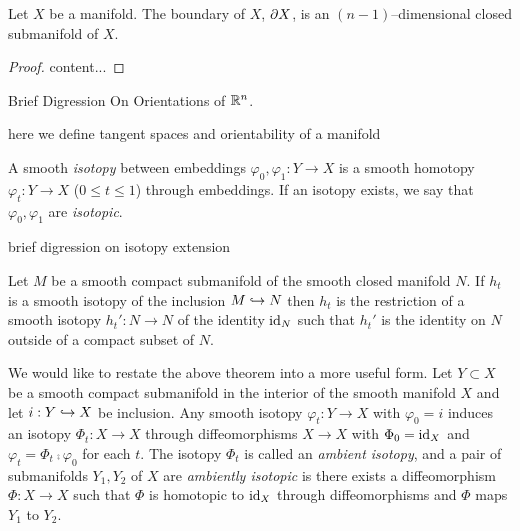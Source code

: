 \begin{prop}
	\label{prop:boundariesaremanifolds}
	Let $X$ be a manifold.
	The boundary of $X$, $\partial X$, is an $(n-1)$--dimensional closed submanifold of $X$.
\end{prop}

\begin{proof}
	content...
\end{proof}

Brief Digression On Orientations of $\mathbb{R}^n$.

\begin{defn}
	\label{def:orient}
	
	here we define tangent spaces and orientability of a manifold
	
\end{defn}

\begin{defn}
	\label{def:isotopy}
	
	A smooth \emph{isotopy} between embeddings $\varphi_0,\varphi_1:Y\to X$ is a smooth homotopy $\varphi_t: Y \to X$ ($0\leq t\leq 1$) through embeddings.
	If an isotopy exists, we say that $\varphi_0,\varphi_1$ are \emph{isotopic}.
	
\end{defn}

brief digression on isotopy extension

\begin{theorem}
	\label{thm:isotopyextension}
	
	Let $M$ be a smooth compact submanifold of the smooth closed manifold $N$.
	If $h_t$ is a smooth isotopy of the inclusion $M\hookrightarrow N$ then $h_t$ is the restriction of a smooth isotopy $h_t':N\to N$ of the identity $\textrm{id}_{N}$ such that $h_t'$ is the identity on $N$ outside of a compact subset of $N$.
	
\end{theorem}

We would like to restate the above theorem into a more useful form.
Let $Y\subset X$ be a smooth compact submanifold in the interior of the smooth manifold $X$ and let $i:Y\hookrightarrow X$ be inclusion.
Any smooth isotopy $\varphi_t:Y\to X$ with $\varphi_0=i$ induces an isotopy $\Phi_t:X\to X$ through diffeomorphisms $X\to X$ with $\Phi_0=\textrm{id}_{X}$ and $\varphi_t=\Phi_t\comp\varphi_0$ for each $t$.
The isotopy $\Phi_t$ is called an \emph{ambient isotopy}, and a pair of submanifolds $Y_1,Y_2$ of $X$ are \emph{ambiently isotopic} is there exists a diffeomorphism $\Phi:X\to X$ such that $\Phi$ is homotopic to $\textrm{id}_{X}$ through diffeomorphisms and $\Phi$ maps $Y_1$ to $Y_2$.
